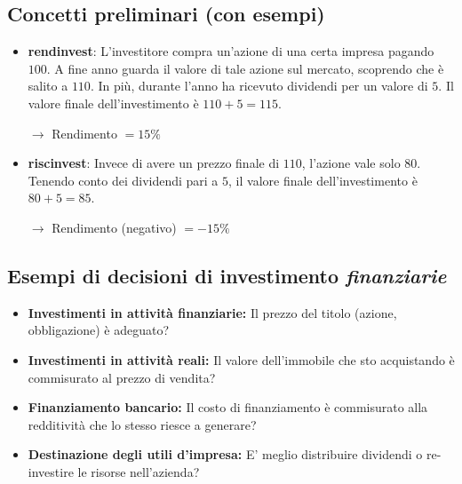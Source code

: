 \subsection{Concetti preliminari (con esempi)}
\begin{itemize}
    \item \textbf{\Gls{rendinvest}}: L’investitore compra un’azione di una certa impresa pagando $100$.
    A fine anno guarda il valore di tale azione sul mercato, scoprendo che è salito a $110$.
    In più, durante l’anno ha ricevuto dividendi per un valore di $5$.
    Il valore finale dell’investimento è $110 + 5 = 115$.

    $\rightarrow$ Rendimento $ = 15\%$

    \item \textbf{\Gls{riscinvest}}: Invece di avere un prezzo finale di $110$, l’azione vale solo $80$.
    Tenendo conto dei dividendi pari a $5$, il valore finale dell’investimento è $80 + 5 = 85$.

    $\rightarrow$ Rendimento (negativo) $= -15\%$
\end{itemize}


\subsection{Esempi di decisioni di investimento \emph{finanziarie}}
\begin{itemize}
    \item \textbf{Investimenti in attività finanziarie:}
    Il prezzo del titolo (azione, obbligazione) è adeguato?
    \item \textbf{Investimenti in attività reali:}
    Il valore dell’immobile che sto acquistando è commisurato al prezzo di vendita?
    \item \textbf{Finanziamento bancario:}
    Il costo di finanziamento è commisurato alla redditività che lo stesso riesce a generare?
    \item \textbf{Destinazione degli utili d’impresa:}
    E’ meglio distribuire dividendi o re-investire le risorse nell’azienda?
\end{itemize}

